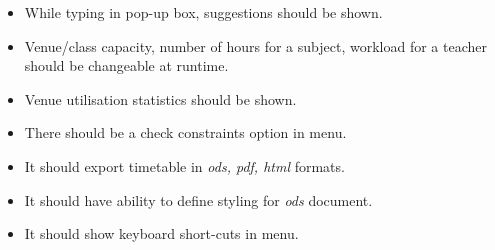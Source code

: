 \begin{itemize}
\item While typing in pop-up box, suggestions should be shown.
\item Venue/class capacity, number of hours for a subject, workload for a teacher should be changeable at runtime.
\item Venue utilisation statistics should be shown.
\item There should be a check constraints option in menu.
\item It should export timetable in \textit{ods, pdf, html} formats.
\item It should have ability to define styling for \textit{ods} document.
\item It should show keyboard short-cuts in menu.
\end{itemize}


